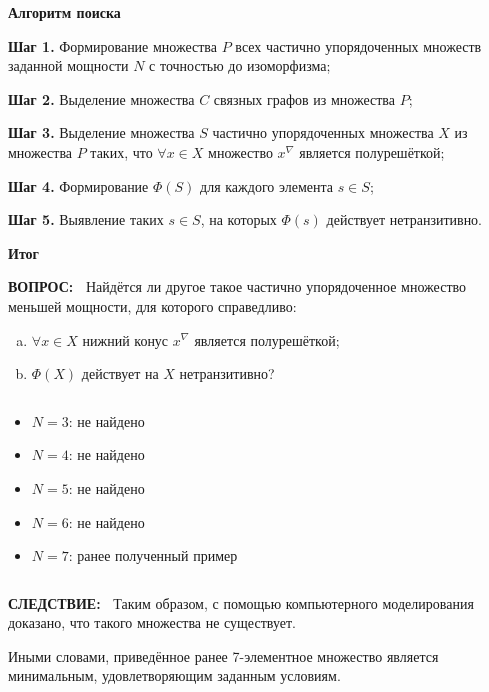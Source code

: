 \documentclass{beamer}
\newcommand{\green}{\color[rgb]{0,0.4,0}}
\newcommand{\blue}{\color{blue}}
\newcommand{\consequence}{%
     {\bf \green СЛЕДСТВИЕ:\ }}
\newcommand{\question}{%
     {\bf \green ВОПРОС:\ }}
\newcommand{\retline}{
	
$ $

}
\begin{document}
\begin{frame}
{\bf {\blue} Алгоритм поиска}

{\bf Шаг 1.}
Формирование множества $P$ всех частично упорядоченных множеств заданной мощности $N$ с точностью до изоморфизма;
\pause

{\bf Шаг 2.}
Выделение множества $C$ связных графов из множества $P$;
\pause

{\bf Шаг 3.}
Выделение множества $S$ частично упорядоченных множества $X$ из множества $P$ таких, что $\forall x \in X$ множество $x^\nabla$ является полурешёткой;
\pause

{\bf Шаг 4.}
Формирование $\Phi(S)$ для каждого элемента $s \in S$;
\pause

{\bf Шаг 5.}
Выявление таких $s \in S$, на которых $\Phi(s)$  действует нетранзитивно.

\end{frame}


\begin{frame}[fragile]
{\bf Итог}

{\question}
Найдётся ли другое такое частично упорядоченное множество меньшей мощности, для которого справедливо:
\begin{enumerate}[(a)]
	\item
$\forall x \in X$ нижний конус $x^\nabla$ является полурешёткой;
	\item
$\Phi(X)$ действует на $X$ нетранзитивно?
\end{enumerate}
{\retline}

\begin{itemize}
\item
$N = 3$: не найдено
\item
$N = 4$: не найдено
\item
$N = 5$: не найдено
\item
$N = 6$: не найдено
\item
$N = 7$: ранее полученный пример
\end{itemize}

{\retline}

{\consequence}
Таким образом, с помощью компьютерного моделирования доказано, что такого множества не существует. 

Иными словами, приведённое ранее 7-элементное множество является минимальным, удовлетворяющим заданным условиям.

\end{frame}
\end{document}
